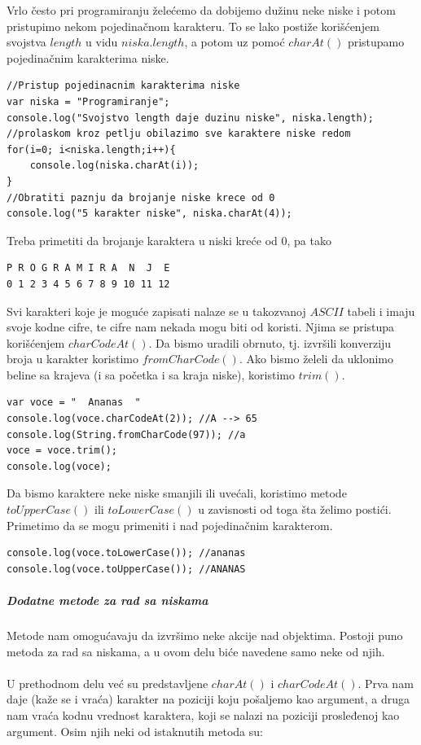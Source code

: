 \documentclass[a4paper]{article}
\begin{document}
Vrlo često pri programiranju želećemo da dobijemo dužinu neke niske i potom pristupimo nekom pojedinačnom karakteru. To se lako postiže korišćenjem svojstva $length$ u vidu $niska.length$, a potom uz pomoć $charAt()$ pristupamo pojedinačnim karakterima niske.
\begin{lstlisting}[backgroundcolor = \color{lightgray}]
//Pristup pojedinacnim karakterima niske
var niska = "Programiranje";
console.log("Svojstvo length daje duzinu niske", niska.length);
//prolaskom kroz petlju obilazimo sve karaktere niske redom
for(i=0; i<niska.length;i++){
    console.log(niska.charAt(i));	
}
//Obratiti paznju da brojanje niske krece od 0
console.log("5 karakter niske", niska.charAt(4));
\end{lstlisting}
Treba primetiti da brojanje karaktera u niski kreće od 0, pa tako 
\begin{lstlisting}[backgroundcolor = \color{lightgray}]
P R O G R A M I R A  N  J  E
0 1 2 3 4 5 6 7 8 9 10 11 12
\end{lstlisting}
Svi karakteri koje je moguće zapisati nalaze se u takozvanoj $ASCII$ tabeli i imaju svoje kodne cifre, te cifre nam nekada mogu biti od koristi. Njima se pristupa korišćenjem $charCodeAt()$. Da bismo uradili obrnuto, tj. izvršili konverziju broja u karakter koristimo $fromCharCode()$. Ako bismo želeli da uklonimo beline sa krajeva (i sa početka i sa kraja niske), koristimo $trim()$. 
\begin{lstlisting}[backgroundcolor = \color{lightgray}]
var voce = "  Ananas  "
console.log(voce.charCodeAt(2)); //A --> 65
console.log(String.fromCharCode(97)); //a
voce = voce.trim();
console.log(voce);     
\end{lstlisting}
Da bismo karaktere neke niske smanjili ili uvećali, koristimo metode $toUpperCase()$ ili $toLowerCase()$ u zavisnosti od toga šta želimo postići. Primetimo da se mogu primeniti i nad pojedinačnim karakterom.
\begin{lstlisting}[backgroundcolor = \color{lightgray}]
console.log(voce.toLowerCase()); //ananas
console.log(voce.toUpperCase()); //ANANAS
\end{lstlisting}
\subparagraph{Dodatne metode za rad sa niskama}
Metode nam omogućavaju da izvršimo neke akcije nad objektima. Postoji puno metoda za rad sa niskama, a u ovom delu biće navedene samo neke od njih. \\\\
U prethodnom delu već su predstavljene $charAt()$ i $charCodeAt()$. Prva nam daje (kaže se i vraća) karakter na poziciji koju pošaljemo kao argument, a druga nam vraća kodnu vrednost karaktera, koji se nalazi na poziciji prosleđenoj kao argument. Osim njih neki od istaknutih metoda su:
\end{document}
